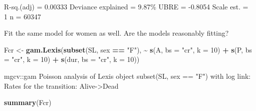 \documentclass[
]{book}
\newenvironment{Shaded}{\begin{snugshade}}{\end{snugshade}}
\newcommand{\AttributeTok}[1]{\textcolor[rgb]{0.13,0.29,0.53}{#1}}
\newcommand{\DecValTok}[1]{\textcolor[rgb]{0.00,0.00,0.81}{#1}}
\newcommand{\FunctionTok}[1]{\textcolor[rgb]{0.13,0.29,0.53}{\textbf{#1}}}
\newcommand{\NormalTok}[1]{#1}
\newcommand{\OtherTok}[1]{\textcolor[rgb]{0.56,0.35,0.01}{#1}}
\newcommand{\SpecialCharTok}[1]{\textcolor[rgb]{0.81,0.36,0.00}{\textbf{#1}}}
\newcommand{\StringTok}[1]{\textcolor[rgb]{0.31,0.60,0.02}{#1}}
\begin{document}
\begin{enumerate}
\begin{Shaded}
\begin{Highlighting}[]
\NormalTok{R{-}sq.(adj) =  0.00333   Deviance explained = 9.87\%}
\NormalTok{UBRE = {-}0.8054  Scale est. = 1         n = 60347}
\end{Highlighting}
\end{Shaded}

  Fit the same model for women as well. Are the models reasonably fitting?

\begin{Shaded}
\begin{Highlighting}[]
\NormalTok{Fcr }\OtherTok{\textless{}{-}} \FunctionTok{gam.Lexis}\NormalTok{(}\FunctionTok{subset}\NormalTok{(SL, sex }\SpecialCharTok{==} \StringTok{"F"}\NormalTok{),}
                 \SpecialCharTok{\textasciitilde{}} \FunctionTok{s}\NormalTok{(A, }\AttributeTok{bs =} \StringTok{"cr"}\NormalTok{, }\AttributeTok{k =} \DecValTok{10}\NormalTok{) }\SpecialCharTok{+}
                   \FunctionTok{s}\NormalTok{(P, }\AttributeTok{bs =} \StringTok{"cr"}\NormalTok{, }\AttributeTok{k =} \DecValTok{10}\NormalTok{) }\SpecialCharTok{+}
                 \FunctionTok{s}\NormalTok{(dur, }\AttributeTok{bs =} \StringTok{"cr"}\NormalTok{, }\AttributeTok{k =} \DecValTok{10}\NormalTok{))}
\end{Highlighting}
\end{Shaded}

\begin{Shaded}
\begin{Highlighting}[]
\NormalTok{mgcv::gam Poisson analysis of Lexis object subset(SL, sex == "F") with log link:}
\NormalTok{Rates for the transition:}
\NormalTok{Alive{-}\textgreater{}Dead}
\end{Highlighting}
\end{Shaded}

\begin{Shaded}
\begin{Highlighting}[]
\FunctionTok{summary}\NormalTok{(Fcr)}
\end{Highlighting}
\end{Shaded}

\begin{Shaded}
\end{Shaded}
\end{enumerate}
\end{document}
